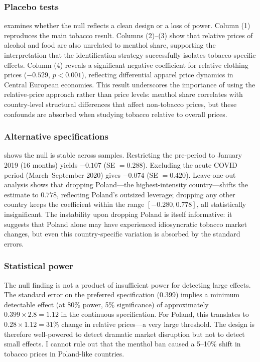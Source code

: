 \documentclass[12pt]{article}
\begin{document}
\subsubsection*{Placebo tests}  examines whether the null reflects a clean design or a loss of power. Column (1) reproduces the main tobacco result. Columns (2)--(3) show that relative prices of alcohol and food are also unrelated to menthol share, supporting the interpretation that the identification strategy successfully isolates tobacco-specific effects. Column (4) reveals a significant negative coefficient for relative clothing prices ($-0.529$, $p < 0.001$), reflecting differential apparel price dynamics in Central European economies. This result underscores the importance of using the relative-price approach rather than price levels: menthol share correlates with country-level structural differences that affect non-tobacco prices, but these confounds are absorbed when studying tobacco relative to overall prices.



\subsubsection*{Alternative specifications}  shows the null is stable across samples. Restricting the pre-period to January 2019 (16 months) yields $-0.107$ (SE $= 0.288$). Excluding the acute COVID period (March--September 2020) gives $-0.074$ (SE $= 0.420$). Leave-one-out analysis shows that dropping Poland---the highest-intensity country---shifts the estimate to $0.778$, reflecting Poland's outsized leverage; dropping any other country keeps the coefficient within the range $[-0.280, 0.778]$, all statistically insignificant. The instability upon dropping Poland is itself informative: it suggests that Poland alone may have experienced idiosyncratic tobacco market changes, but even this country-specific variation is absorbed by the standard errors.



\subsubsection*{Statistical power} The null finding is not a product of insufficient power for detecting large effects. The standard error on the preferred specification (0.399) implies a minimum detectable effect (at 80\% power, 5\% significance) of approximately $0.399 \times 2.8 = 1.12$ in the continuous specification. For Poland, this translates to $0.28 \times 1.12 = 31$\% change in relative prices---a very large threshold. The design is therefore well-powered to detect dramatic market disruption but not to detect small effects. I cannot rule out that the menthol ban caused a 5--10\% shift in tobacco prices in Poland-like countries.
\end{document}
